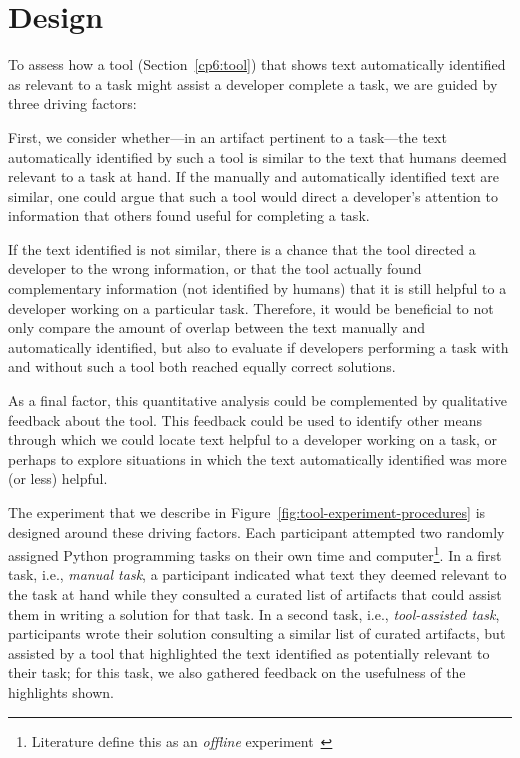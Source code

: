 
\section{Design}
\label{cp6:design}



To assess how a tool (Section~\ref{cp6:tool}) that shows text automatically identified as relevant to a task
might assist a developer complete a task, we are guided by three driving factors:


First, we consider whether---in an artifact pertinent to a task---the  text automatically identified by such a tool is similar to the text that humans deemed relevant to a task at hand. 
If the manually and automatically identified text are similar, one could argue that such a tool  
would direct a developer's attention to information that others found useful for completing a task.


If the text identified is not similar, there is a chance that the tool directed a developer to the wrong information, or that 
the tool actually found complementary information (not identified by humans) that it is still helpful to a developer working on a particular task. 
Therefore, it would be beneficial to not only compare the amount of overlap between the text manually
and automatically identified, but also to evaluate if developers performing a task with and without such a tool  
both reached equally correct solutions.


As a final factor, this quantitative analysis could be complemented by qualitative feedback about the tool. 
This feedback could be used to identify other means through which we could locate 
text helpful to a developer working on a task, or perhaps to explore
situations in which the text automatically identified 
was more (or less) helpful.



The experiment that we describe in Figure~\ref{fig:tool-experiment-procedures} is designed around these driving factors.  
Each participant attempted two randomly assigned Python programming tasks on their own time and computer\footnote{Literature define this as an \textit{offline} experiment~\cite{wohlin2012, DeLucia2012}}.
In a first task, i.e., \textit{manual task}, a participant indicated 
what text they deemed relevant to the task at hand while 
they consulted a curated list of artifacts that could assist them in writing a solution for that task.
In a second task, i.e., \textit{tool-assisted task},
participants wrote their solution consulting a similar list of curated artifacts, but
assisted by a tool that highlighted the text identified as potentially relevant to their task; for this task, we also gathered feedback on the usefulness of the highlights shown.

